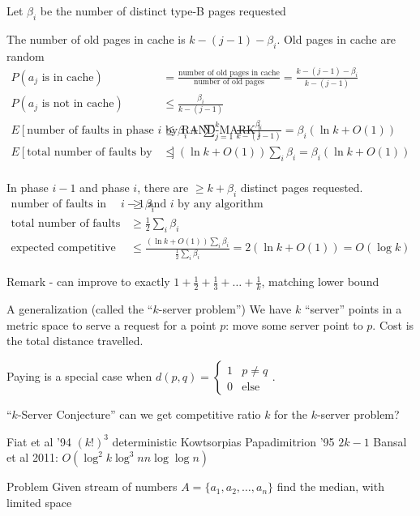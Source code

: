 \documentclass[english,12pt]{article}
\theoremstyle{plain}
\theoremstyle{definition}
\theoremstyle{definition} %
\begin{document}
Let $\beta_i$ be the number of distinct type-B pages requested

The number of old pages in cache is $k-(j-1)-\beta_i$.  Old pages in cache are random
\begin{align*}
P(a_j\text{ is in cache})&= \frac{\text{number of old pages in cache}}{\text{number of old pages}}=\frac{k-(j-1)-\beta_i}{k-(j-1)}\\
P(a_j\text{ is not in cache})&\le \frac{\beta_i}{k-(j-1)}\\
E\left[\text{number of faults in phase }i \text{ by RAND-MARK}\right] &\le \beta_i + \sum_{j=1}^k \frac{\beta_i}{k-(j-1)}
=\beta_i(\ln k + O(1))\\
E\left[\text{total number of faults by RAND-MARK}\right] &\le (\ln k + O(1))\sum_i\beta_i
=\beta_i(\ln k + O(1))\\
\end{align*}

In phase $i-1$ and phase $i$, there are $\ge k + \beta_i$ distinct pages requested.
\begin{align*}
\text{number of faults in phase }i-1 \text{ and }i &\ge\beta_i\qquad \text{by any algorithm}\\
\text{total number of faults by any algorithm}&\ge\frac{1}{2}\sum_i\beta_i\\
\text{expected competitive ratio} &\le \frac{(\ln k + O(1))\sum_i\beta_i}{\frac{1}{2}\sum_i\beta_i}
=2(\ln k + O(1))
=O(\log k)
\end{align*}

Remark - can improve to exactly $1+\frac{1}{2}+\frac{1}{3}+\ldots+\frac{1}{k}$, matching lower bound

A generalization (called the ``$k$-server problem'')  We have $k$ ``server'' points in a metric space to serve a request for a point $p$:  
move some server point to $p$.  Cost is the total distance travelled.

Paying is a special case when $d(p,q)=\begin{cases}1 & p\ne q\\ 0 & \text{else}\end{cases}$.

``$k$-Server Conjecture'' can we get competitive ratio $k$ for the $k$-server problem?

Fiat et al '94 $(k!)^3$ deterministic
Kowtsorpias Papadimitrion '95 $2k-1$
Bansal et al 2011: $O(\log^2 k\log^3 n n \log\log n)$


Problem Given stream of numbers $A=\{a_1,a_2,\ldots, a_n\}$ find the median, with limited space
\end{document}
